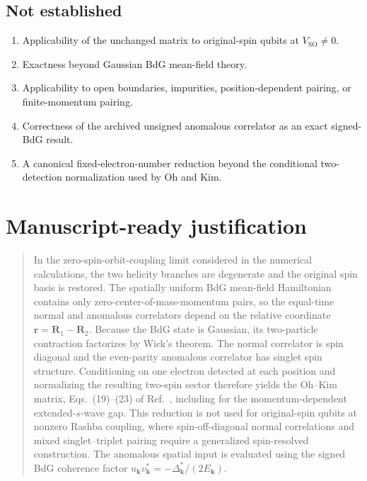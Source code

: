\documentclass[11pt]{article}
\newcommand{\SO}{\mathrm{SO}}
\begin{document}
\subsection*{Not established}
\begin{enumerate}
    \item Applicability of the unchanged matrix to original-spin qubits at $V_{\SO}\neq0$.
    \item Exactness beyond Gaussian BdG mean-field theory.
    \item Applicability to open boundaries, impurities, position-dependent pairing, or finite-momentum pairing.
    \item Correctness of the archived unsigned anomalous correlator as an exact signed-BdG result.
    \item A canonical fixed-electron-number reduction beyond the conditional two-detection normalization used by Oh and Kim.
\end{enumerate}

\section{Manuscript-ready justification}

\begin{quote}
In the zero-spin-orbit-coupling limit considered in the numerical calculations, the two helicity branches are degenerate and the original spin basis is restored. The spatially uniform BdG mean-field Hamiltonian contains only zero-center-of-mass-momentum pairs, so the equal-time normal and anomalous correlators depend on the relative coordinate $\mathbf r=\mathbf R_1-\mathbf R_2$. Because the BdG state is Gaussian, its two-particle contraction factorizes by Wick's theorem. The normal correlator is spin diagonal and the even-parity anomalous correlator has singlet spin structure. Conditioning on one electron detected at each position and normalizing the resulting two-spin sector therefore yields the Oh--Kim matrix, Eqs.~(19)--(23) of Ref.~\cite{OhKim}, including for the momentum-dependent extended-$s$-wave gap. This reduction is not used for original-spin qubits at nonzero Rashba coupling, where spin-off-diagonal normal correlations and mixed singlet--triplet pairing require a generalized spin-resolved construction. The anomalous spatial input is evaluated using the signed BdG coherence factor $u_{\mathbf k}v_{\mathbf k}^*=-\Delta_{\mathbf k}^*/(2E_{\mathbf k})$.
\end{quote}
\end{document}
